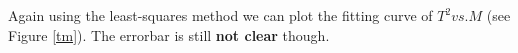     Again using the least-squares method we can plot the fitting curve of $T^2 vs. M$ (see Figure \ref{tm}). The errorbar is still \textbf{not clear} though.

